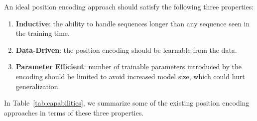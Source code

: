 \documentclass[11pt]{article}
\begin{document}
An ideal position encoding approach should satisfy the following three properties:
\begin{enumerate}[nosep,leftmargin=1em,labelwidth=*,align=left]
    \item {\bf Inductive}: the ability to handle sequences longer than any sequence seen in the training time.
    \item {\bf Data-Driven}: the position encoding should be learnable from the data.
    \item {\bf Parameter Efficient}: number of trainable parameters introduced by the encoding should be limited to avoid increased model size, which could hurt generalization.
\end{enumerate}

In Table~\ref{tab:capabilities}, we summarize some of the existing position encoding approaches in terms of these three properties.
\par
\end{document}
